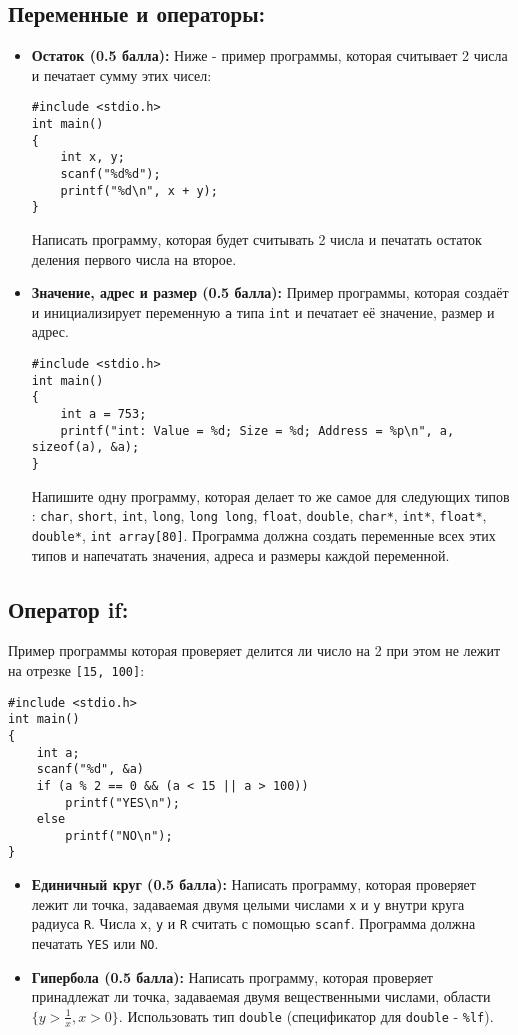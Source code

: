 \documentclass{article}
\begin{document}
\subsection*{Переменные и операторы:}
\begin{itemize}
\item \textbf{Остаток (0.5 балла):} Ниже - пример программы, которая считывает 2 числа и печатает сумму этих чисел:
\begin{lstlisting}
#include <stdio.h>
int main()
{
	int x, y;
	scanf("%d%d");
	printf("%d\n", x + y);
}
\end{lstlisting}
Написать программу, которая будет считывать 2 числа и печатать остаток деления первого числа на второе.
\item \textbf{Значение, адрес и размер (0.5 балла):} Пример программы, которая создаёт и инициализирует переменную \texttt{a} типа \texttt{int} и печатает её значение, размер и адрес.
\begin{lstlisting}
#include <stdio.h>
int main()
{
	int a = 753;
	printf("int: Value = %d; Size = %d; Address = %p\n", a, sizeof(a), &a);
}
\end{lstlisting}
Напишите одну программу, которая делает то же самое для следующих типов : \texttt{char}, \texttt{short}, \texttt{int}, \texttt{long}, \texttt{long long}, \texttt{float}, \texttt{double}, \texttt{char*}, \texttt{int*}, \texttt{float*}, \texttt{double*}, \texttt{int array[80]}. Программа должна создать переменные всех этих типов и напечатать значения, адреса и размеры каждой переменной.
\end{itemize}
\newpage

\subsection*{Оператор if:}
Пример программы которая проверяет делится ли число на 2 при этом не лежит на отрезке \texttt{[15, 100]}:
\begin{lstlisting}
#include <stdio.h>
int main()
{
	int a;
	scanf("%d", &a)
	if (a % 2 == 0 && (a < 15 || a > 100))
		printf("YES\n");
	else
		printf("NO\n");
}
\end{lstlisting}
\begin{itemize}
\item \textbf{Единичный круг (0.5 балла):} Написать программу, которая проверяет лежит ли точка, задаваемая двумя целыми числами \texttt{x} и \texttt{y} внутри круга радиуса \texttt{R}. Числа \texttt{x}, \texttt{y} и \texttt{R} считать с помощью \texttt{scanf}. Программа должна печатать \texttt{YES} или \texttt{NO}.
\item \textbf{Гипербола (0.5 балла):} Написать программу, которая проверяет принадлежат ли точка, задаваемая двумя вещественными числами, области\\  $\{y > \frac{1}{x}, x > 0\}$. Использовать тип \texttt{double} (спецификатор для \texttt{double} - \texttt{\%lf}).
\end{itemize}
\end{document}
